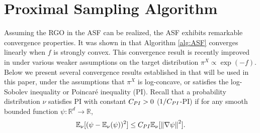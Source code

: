 \documentclass[11pt,letterpaper]{article}
\newcommand{\chen}{\color{cyan}}
\newcommand{\R}{\mathbb{R}}
\newcommand{\norm}[1]{\left\Vert#1\right\Vert}
\newcommand{\mE}{\mathbb{E}}
\begin{document}














\section{Proximal Sampling Algorithm}\label{sec:sampling}


Assuming the RGO in the ASF can be realized, the ASF exhibits remarkable convergence properties. It was shown in \cite{lee2021structured} that Algorithm \ref{alg:ASF} converges linearly when $f$ is strongly convex. This convergence result is recently improved in \cite{chen2022improved} under various weaker assumptions on the target distribution $\pi^X \propto \exp(-f)$. Below we present several convergence results established in \cite{chen2022improved} that will be used in this paper, under the assumptions that $\pi^X$ is log-concave, or satisfies the log-Sobolev inequality or Poincar\'e inequality (PI). 
Recall that a probability distribution $\nu$ satisfies PI with constant $C_{\rm PI} > 0$ ($1/C_{\rm PI}$-PI) if for any smooth bounded function $\psi : \R^d\to\R$,
\[
    \mE_\nu[(\psi-\mE_\nu(\psi))^2]
    \le C_{\rm PI} \mE_\nu[\norm{\nabla \psi}^2].
\]
\end{document}

